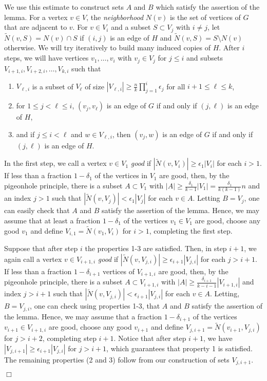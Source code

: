 \documentclass[11pt]{article}
\newenvironment{proof}
      {\medskip\noindent{\bf Proof.}\hspace{1mm}}
      {\hfill$\Box$\medskip}
\begin{document}
\begin{proof}
We use this estimate to construct sets $A$ and $B$ which satisfy the assertion of the lemma.
For a vertex $v \in V$, the {\it neighborhood} $N(v)$ is the set of
vertices of $G$ that are adjacent to $v$. For $v \in V_i$ and a
subset $S \subset V_j$ with $i \not = j$, let $\tilde{N}(v,S)=N(v) \cap S$
if $(i,j)$ is an edge of $H$ and $\tilde{N}(v,S)=S \setminus N(v)$
otherwise. We will try iteratively to build many induced copies of $H$.
After $i$ steps, we will
have vertices $v_1,\ldots,v_{i}$ with $v_j \in
V_j$ for $j \leq i$ and subsets
$V_{i+1,i}, V_{i+2,i},\ldots, V_{k,i}$ such that
\begin{enumerate}
\item $V_{\ell,i}$ is a subset of $V_{\ell}$ of size $|V_{\ell,i}| \geq \frac{n}{k}\prod_{j=1}^i\epsilon_j$ for all $i+1 \leq
\ell \leq k$,
\item for $1 \leq j<\ell \leq i$, $(v_j,v_{\ell})$ is an edge of $G$  if and
only if $(j,\ell)$ is an edge of $H$,
\item and if $j \leq i<\ell$ and $w \in V_{\ell,i}$, then
$(v_j,w)$ is an edge of $G$ if and only if $(j,\ell)$ is an edge of
$H$.
\end{enumerate}

In the first step, we call a vertex $v\in V_1$ {\it good} if
$|\tilde{N}(v,V_i)| \geq \epsilon_1|V_i|$ for each $i >1$. If less than a
fraction $1-\delta_1$ of the vertices in $V_1$ are good, then, by
the pigeonhole principle, there is a subset $A \subset V_1$ with
$|A|\geq \frac{\delta_1}{k-1}|V_1|=\frac{\delta_1}{k(k-1)}n$ and an index $j > 1$ such that
$|\tilde{N}(v,V_j)| < \epsilon_1|V_j|$ for each $v \in A$. Letting $B=V_j$, one can easily check that
$A$ and $B$ satisfy the assertion of the lemma. Hence, we may assume that at least a
fraction $1-\delta_1$ of the vertices $v_1 \in V_1$ are good, choose any good $v_1$ and
define $V_{i,1}=\tilde{N}(v_1,V_i)$ for $i>1$, completing the first step.

Suppose that after step $i$ the properties 1-3 are satisfied. Then,
in step $i+1$, we again call a vertex $v \in V_{i+1,i}$ {\it good} if
$|\tilde{N}(v,V_{j,i})| \geq \epsilon_{i+1}|V_{j,i}|$ for each $j>i+1$. If
less than a fraction $1-\delta_{i+1}$ vertices of $V_{i+1,i}$ are
good, then, by the pigeonhole principle, there is a subset $A
\subset V_{i+1,i}$ with
$|A|\geq \frac{\delta_{i+1}}{k-i-1}|V_{i+1,i}|$
and index $j >i+1$ such that
$|\tilde{N}(v,V_{j,i})|<\epsilon_{i+1}|V_{j,i}|$ for each $v \in A$. Letting,
$B=V_{j,i}$, one can check using properties 1-3, that
$A$ and $B$ satisfy the assertion of the lemma. Hence, we may assume that a
fraction $1-\delta_{i+1}$ of the vertices $v_{i+1} \in V_{i+1,i}$
are good, choose any good $v_{i+1}$ and define $V_{j,i+1}=\tilde{N}(v_{i+1},V_{j,i})$ for $j>i+2$,
completing step $i+1$. Notice that after step $i+1$, we have
$|V_{j,i+1}|\geq \epsilon_{i+1}|V_{j,i}|$ for $j>i+1$, which guarantees that
property 1 is satisfied. The remaining properties (2 and 3) follow from
our construction of sets $V_{j,i+1}$.


\end{proof}
\end{document}
